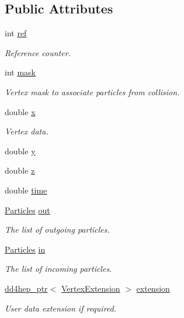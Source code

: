 \subsection*{Public Attributes}
\begin{DoxyCompactItemize}
\item 
int \hyperlink{class_d_d4hep_1_1_simulation_1_1_geant4_vertex_a27572aae6fd5018503860b323bc9d34e}{ref}
\begin{DoxyCompactList}\small\item\em Reference counter. \end{DoxyCompactList}\item 
int \hyperlink{class_d_d4hep_1_1_simulation_1_1_geant4_vertex_acd55879e69a2b47c68af29904abb584a}{mask}
\begin{DoxyCompactList}\small\item\em Vertex mask to associate particles from collision. \end{DoxyCompactList}\item 
double \hyperlink{class_d_d4hep_1_1_simulation_1_1_geant4_vertex_a0c73b563689113d23c51d5b5864a63f8}{x}
\begin{DoxyCompactList}\small\item\em Vertex data. \end{DoxyCompactList}\item 
double \hyperlink{class_d_d4hep_1_1_simulation_1_1_geant4_vertex_afbb9e4460c4c7a1610b5d3d0ccb37e25}{y}
\item 
double \hyperlink{class_d_d4hep_1_1_simulation_1_1_geant4_vertex_af2489a2b21e08b2cc0ffe1f4bf1937df}{z}
\item 
double \hyperlink{class_d_d4hep_1_1_simulation_1_1_geant4_vertex_a3c68aa0fed7db61bf66bfcfb03ad5ca0}{time}
\item 
\hyperlink{class_d_d4hep_1_1_simulation_1_1_geant4_vertex_a7a0331b96dfa8ff9b4a802caa8dd031c}{Particles} \hyperlink{class_d_d4hep_1_1_simulation_1_1_geant4_vertex_a238ee91ad7a5d6230d58335af4af6d70}{out}
\begin{DoxyCompactList}\small\item\em The list of outgoing particles. \end{DoxyCompactList}\item 
\hyperlink{class_d_d4hep_1_1_simulation_1_1_geant4_vertex_a7a0331b96dfa8ff9b4a802caa8dd031c}{Particles} \hyperlink{class_d_d4hep_1_1_simulation_1_1_geant4_vertex_acf382e2d22907f72105b2a107e167327}{in}
\begin{DoxyCompactList}\small\item\em The list of incoming particles. \end{DoxyCompactList}\item 
\hyperlink{class_d_d4hep_1_1dd4hep__ptr}{dd4hep\+\_\+ptr}$<$ \hyperlink{class_d_d4hep_1_1_simulation_1_1_vertex_extension}{Vertex\+Extension} $>$ \hyperlink{class_d_d4hep_1_1_simulation_1_1_geant4_vertex_ae8dbe294b3aa5ef164d5a8e5b4c7895c}{extension}
\begin{DoxyCompactList}\small\item\em User data extension if required. \end{DoxyCompactList}\end{DoxyCompactItemize}


